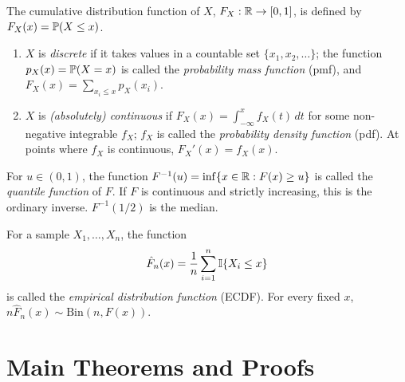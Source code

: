 \documentclass[main.tex]{subfiles}
\begin{document}
\begin{definition}
The cumulative distribution function of $X$, $F_X:\R\to[0,1]$, is defined by $F_X(x)=\P(X\le x)$.
\end{definition}

\begin{definition}
\begin{enumerate}
  \item $X$ is \emph{discrete} if it takes values in a countable set $\{x_1,x_2,\dots\}$; the function $p_X(x)=\P(X=x)$ is called the \emph{probability mass function} (pmf), and $F_X(x)=\sum_{x_i\le x}p_X(x_i)$.
  \item $X$ is \emph{(absolutely) continuous} if $F_X(x)=\int_{-\infty}^x f_X(t)\,dt$ for some non-negative integrable $f_X$; $f_X$ is called the \emph{probability density function} (pdf). At points where $f_X$ is continuous, $F_X'(x)=f_X(x)$.
\end{enumerate}
\end{definition}

\begin{definition}
For $u\in(0,1)$, the function $F^{-1}(u)=\inf\{x\in\R: F(x)\ge u\}$ is called the \emph{quantile function} of $F$. If $F$ is continuous and strictly increasing, this is the ordinary inverse. $F^{-1}(1/2)$ is the median.
\end{definition}

\begin{definition}
For a sample $X_1,\dots,X_n$, the function
\[
\hat F_n(x)=\frac1n\sum_{i=1}^n \I\{X_i\le x\}
\]
is called the \emph{empirical distribution function} (ECDF). For every fixed $x$, $n\hat F_n(x)\sim\text{Bin}(n,F(x))$.
\end{definition}

\section{Main Theorems and Proofs}
\end{document}
